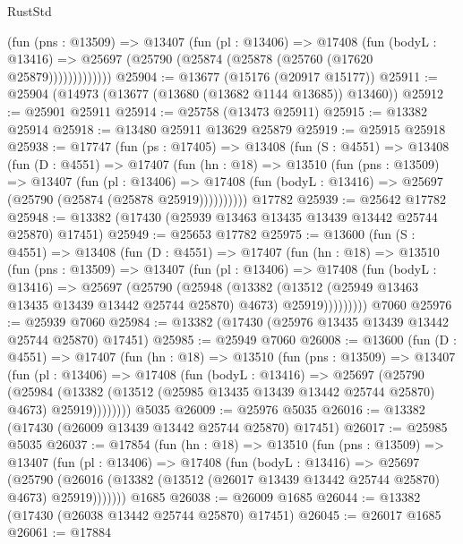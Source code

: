 \begin{lexlean}{RustStd}
\begin{coremodule}
              (fun (pns : @13509) =>
              @13407
                (fun (pl : @13406) =>
                @17408
                  (fun (bodyL : @13416) =>
                  @25697 (@25790 (@25874 (@25878 (@25760 (@17620 @25879)))))))))))))
@25904 := @13677 (@15176 (@20917 @15177))
@25911 := @25904 (@14973 (@13677 (@13680 (@13682 @1144 @13685)) @13460))
@25912 := @25901 @25911
@25914 := @25758 (@13473 @25911)
@25915 := @13382 @25914
@25918 := @13480 @25911 @13629 @25879
@25919 := @25915 @25918
@25938 := @17747
    (fun (ps : @17405) =>
    @13408
      (fun (S : @4551) =>
      @13408
        (fun (D : @4551) =>
        @17407
          (fun (hn : @18) =>
          @13510
            (fun (pns : @13509) =>
            @13407
              (fun (pl : @13406) =>
              @17408 (fun (bodyL : @13416) => @25697 (@25790 (@25874 (@25878 @25919))))))))))
    @17782
@25939 := @25642 @17782
@25948 := @13382 (@17430 (@25939 @13463 @13435 @13439 @13442 @25744 @25870) @17451)
@25949 := @25653 @17782
@25975 := @13600
    (fun (S : @4551) =>
    @13408
      (fun (D : @4551) =>
      @17407
        (fun (hn : @18) =>
        @13510
          (fun (pns : @13509) =>
          @13407
            (fun (pl : @13406) =>
            @17408
              (fun (bodyL : @13416) =>
              @25697
                (@25790
                  (@25948
                    (@13382
                      (@13512 (@25949 @13463 @13435 @13439 @13442 @25744 @25870) @4673)
                      @25919)))))))))
    @7060
@25976 := @25939 @7060
@25984 := @13382 (@17430 (@25976 @13435 @13439 @13442 @25744 @25870) @17451)
@25985 := @25949 @7060
@26008 := @13600
    (fun (D : @4551) =>
    @17407
      (fun (hn : @18) =>
      @13510
        (fun (pns : @13509) =>
        @13407
          (fun (pl : @13406) =>
          @17408
            (fun (bodyL : @13416) =>
            @25697
              (@25790
                (@25984
                  (@13382 (@13512 (@25985 @13435 @13439 @13442 @25744 @25870) @4673) @25919))))))))
    @5035
@26009 := @25976 @5035
@26016 := @13382 (@17430 (@26009 @13439 @13442 @25744 @25870) @17451)
@26017 := @25985 @5035
@26037 := @17854
    (fun (hn : @18) =>
    @13510
      (fun (pns : @13509) =>
      @13407
        (fun (pl : @13406) =>
        @17408
          (fun (bodyL : @13416) =>
          @25697
            (@25790
              (@26016 (@13382 (@13512 (@26017 @13439 @13442 @25744 @25870) @4673) @25919)))))))
    @1685
@26038 := @26009 @1685
@26044 := @13382 (@17430 (@26038 @13442 @25744 @25870) @17451)
@26045 := @26017 @1685
@26061 := @17884

\end{coremodule}
\end{lexlean}
